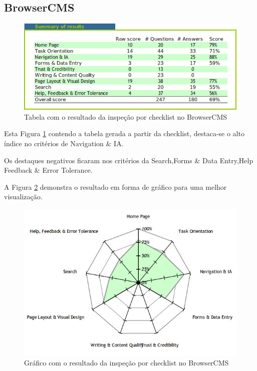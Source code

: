 \subsection{BrowserCMS}

\begin{figure}[here]
\includegraphics[width=130mm]{images/browsercms_result_checklist_table.jpg}
\caption{Tabela com o resultado da inspeção por checklist no BrowserCMS}
\label{fig:resultado_checklist_browsercms_tabela}
\end{figure}

Esta Figura \ref{fig:resultado_checklist_browsercms_tabela} contendo a tabela gerada a partir da checklist, destaca-se o alto índice no critérios de Navigation & IA. 

Os destaques negativos ficaram nos critérios da Search,Forms \& Data Entry,Help Feedback \& Error Tolerance. 

A Figura \ref{fig:resultado_checklist_browsercms_grafico} demonstra o resultado em forma de gráfico para uma melhor visualização.

\begin{figure}[here]
\includegraphics[scale=0.5]{images/browsercms_result_checklist_graph.jpg}
\caption{Gráfico com o resultado da inspeção por checklist no BrowserCMS}
\label{fig:resultado_checklist_browsercms_grafico}
\end{figure}

